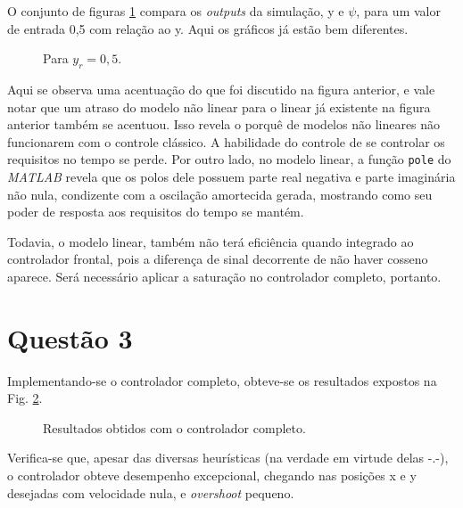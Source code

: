 \documentclass{article}[twocolumn]
\begin{document}
	O conjunto de figuras \ref{fig:lateral5} compara os \textit{outputs} da simula\c{c}\~ao,
	y e $\psi$, para um valor de entrada 0,5 com rela\c{c}\~ao ao y. Aqui os gr\'aficos
	j\'a est\~ao bem diferentes.
	\begin{figure}[H]
		\centering
		\caption{Para $y_r = 0,5$.}
		\label{fig:lateral5}
	\end{figure}
	Aqui se observa uma acentua\c{c}\~ao do que foi discutido na figura anterior, e vale
	notar que um atraso do modelo n\~ao linear para o linear j\'a existente na figura
	anterior tamb\'em se acentuou. Isso revela o porqu\^e de modelos n\~ao lineares n\~ao
	funcionarem com o controle cl\'assico. A habilidade do controle de se controlar os
	requisitos no tempo se perde. Por outro lado, no modelo linear, a fun\c{c}\~ao
	\texttt{pole} do \textit{MATLAB} revela que os polos dele possuem parte real negativa
	e parte imagin\'aria n\~ao nula, condizente com a oscila\c{c}\~ao amortecida
	gerada, mostrando como seu poder de resposta aos requisitos do tempo se mant\'em.

	Todavia, o modelo linear, tamb\'em n\~ao ter\'a efici\^encia quando integrado ao
	controlador frontal, pois a diferen\c{c}a de sinal decorrente de n\~ao haver cosseno
	aparece. Ser\'a necess\'ario aplicar a satura\c{c}\~ao no controlador completo, portanto.
	\section{Quest\~ao 3}
	Implementando-se o controlador completo, obteve-se os resultados expostos
	na Fig. \ref{fig:complete_control}.
	\begin{figure}[H]
		\centering
		\caption{Resultados obtidos com o controlador completo.}
		\label{fig:complete_control}
	\end{figure}
	Verifica-se que, apesar das diversas heur\'isticas (na verdade em virtude delas -.-),
	o controlador obteve desempenho excepcional, chegando nas posi\c{c}\~oes x e y
	desejadas com velocidade nula, e \textit{overshoot} pequeno.
\end{document}
